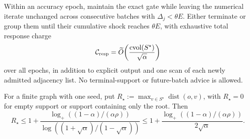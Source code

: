 \begin{problem}
\label{prob:light-shock-response}
Within an accuracy epoch, maintain the exact gate while leaving the numerical
iterate unchanged across consecutive batches with $\Delta_j<\theta E$.
Either terminate or group them until their cumulative shock reaches
$\theta E$, with exhaustive total response charge
\begin{equation}
 \mathcal C_{\rm resp}
 =\widetilde O\!\left(
  \frac{\operatorname{cvol}(S^\star)}{\sqrt\alpha}
 \right)
 \label{eq:light-shock-response-target}
\end{equation}
over all epochs, in addition to explicit output and one scan of each newly
admitted adjacency list.  No terminal-support or future-batch advice is
allowed.
\end{problem}

\begin{lemma}
\label{lem:aggregate-support-radius}
For a finite graph with one seed, put
$R_\star:=\max_{v\in S^\star}\operatorname{dist}(o,v)$, with $R_\star=0$ for
empty support or support containing only the root.  Then
\begin{equation}
 R_\star
 \leq1+
 \frac{\log_+((1-\alpha)/(\alpha\rho))}
 {\log((1+\sqrt\alpha)/(1-\sqrt\alpha))}
 \leq1+
 \frac{\log_+((1-\alpha)/(\alpha\rho))}{2\sqrt\alpha}.
 \label{eq:aggregate-tree-radius}
\end{equation}
\end{lemma}


